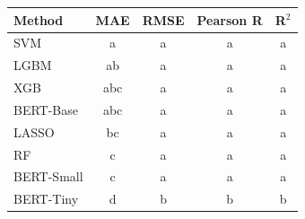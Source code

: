 \begin{tabular}{lcccc}
\toprule
Method & MAE & RMSE & Pearson R & R$^2$ \\
\midrule
SVM & a & a & a & a \\
LGBM & ab & a & a & a \\
XGB & abc & a & a & a \\
BERT-Base & abc & a & a & a \\
LASSO & bc & a & a & a \\
RF & c & a & a & a \\
BERT-Small & c & a & a & a \\
BERT-Tiny & d & b & b & b \\
\bottomrule
\end{tabular}
